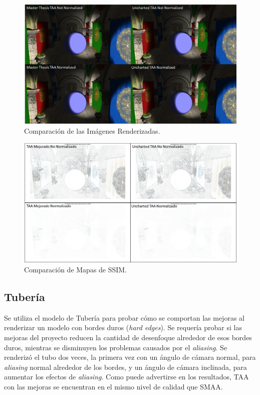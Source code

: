 \documentclass[pregrado]{tesis-usb} %
\begin{document}
\begin{figure}[!htb]
	\centering
	\includegraphics[scale=0.41]{images/results/sharpen_test_render.png}
	\caption{Comparación de las Imágenes Renderizadas.}\label{fig:sharpen_render}
\end{figure}

\begin{figure}[!htb]
	\centering
	\includegraphics[scale=0.9]{images/results/sharpen_test_ssim.png}
	\caption{Comparación de Mapas de SSIM.}\label{fig:sharpen_ssim}
\end{figure}

\FloatBarrier
\subsection{Tubería}
Se utiliza el modelo de Tubería para probar cómo se comportan las mejoras al renderizar un modelo con bordes duros (\textit{hard edges}). Se requería probar si las mejoras del proyecto reducen la cantidad de desenfoque alrededor de esos bordes duros, mientras se disminuyen los problemas causados por el \textit{aliasing}. Se renderizó el tubo dos veces, la primera vez con un ángulo de cámara normal, para \textit{aliasing} normal alrededor de los bordes, y un ángulo de cámara inclinada, para aumentar los efectos de \textit{aliasing}. Como puede advertirse en los resultados, TAA con las mejoras se encuentran en el mismo nivel de calidad que SMAA.
\end{document}

